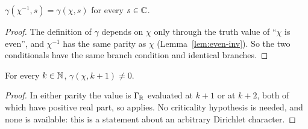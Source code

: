 \begin{lemma}
  \label{lem:gammaFactor-inv}
  \leanok
  $\gamma(\chi^{-1}, s) = \gamma(\chi, s)$ for every $s \in \mathbb{C}$.
\end{lemma}
\begin{proof}
  \leanok
  The definition of $\gamma$ depends on $\chi$ only through the truth value of
  ``$\chi$ is even'', and $\chi^{-1}$ has the same parity as $\chi$
  (Lemma~\ref{lem:even-inv}). So the two conditionals have the same branch condition and
  identical branches.
\end{proof}

\begin{lemma}
  \label{lem:gammaFactor-pos-ne-zero}
  \leanok
  For every $k \in \mathbb{N}$, $\gamma(\chi, k+1) \neq 0$.
\end{lemma}
\begin{proof}
  \leanok
  In either parity the value is $\Gamma_{\mathbb{R}}$ evaluated at $k+1$ or at $k+2$, both of which
  have positive real part, so  applies. No
  criticality hypothesis is needed, and none is available: this is a statement about an
  arbitrary Dirichlet character.
\end{proof}
